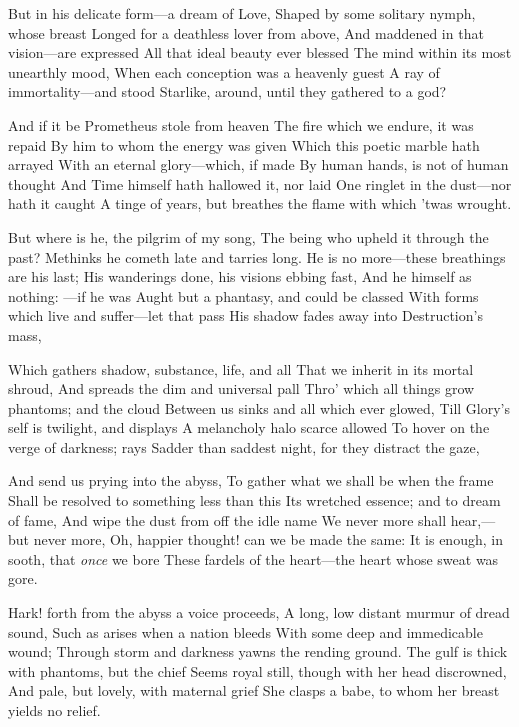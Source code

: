 \documentclass[10pt,twocolumn]{book}
\begin{document}
   But in his delicate form---a dream of Love,
   Shaped by some solitary nymph, whose breast
   Longed for a deathless lover from above,
   And maddened in that vision---are expressed
   All that ideal beauty ever blessed
   The mind within its most unearthly mood,
   When each conception was a heavenly guest\textemdash
   A ray of immortality---and stood
Starlike, around, until they gathered to a god?


   And if it be Prometheus stole from heaven
   The fire which we endure, it was repaid
   By him to whom the energy was given
   Which this poetic marble hath arrayed
   With an eternal glory---which, if made
   By human hands, is not of human thought
   And Time himself hath hallowed it, nor laid
   One ringlet in the dust---nor hath it caught
A tinge of years, but breathes the flame with which 'twas wrought.


   But where is he, the pilgrim of my song,
   The being who upheld it through the past?
   Methinks he cometh late and tarries long.
   He is no more---these breathings are his last;
   His wanderings done, his visions ebbing fast,
   And he himself as nothing: ---if he was
   Aught but a phantasy, and could be classed
   With forms which live and suffer---let that pass\textemdash
His shadow fades away into Destruction's mass,


   Which gathers shadow, substance, life, and all
   That we inherit in its mortal shroud,
   And spreads the dim and universal pall
   Thro' which all things grow phantoms; and the cloud
   Between us sinks and all which ever glowed,
   Till Glory's self is twilight, and displays
   A melancholy halo scarce allowed
   To hover on the verge of darkness; rays
Sadder than saddest night, for they distract the gaze,


   And send us prying into the abyss,
   To gather what we shall be when the frame
   Shall be resolved to something less than this
   Its wretched essence; and to dream of fame,
   And wipe the dust from off the idle name
   We never more shall hear,---but never more,
   Oh, happier thought! can we be made the same:
   It is enough, in sooth, that \textit{once} we bore
These fardels of the heart---the heart whose sweat was gore.


   Hark! forth from the abyss a voice proceeds,
   A long, low distant murmur of dread sound,
   Such as arises when a nation bleeds
   With some deep and immedicable wound;
   Through storm and darkness yawns the rending ground.
   The gulf is thick with phantoms, but the chief
   Seems royal still, though with her head discrowned,
   And pale, but lovely, with maternal grief
She clasps a babe, to whom her breast yields no relief.
\end{document}
